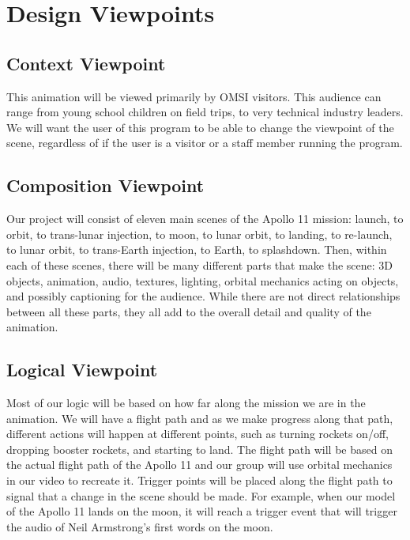 \documentclass[onecolumn, draftclsnofoot,10pt, compsoc]{IEEEtran}
\begin{document}
\section{Design Viewpoints}

    \subsection{Context Viewpoint}
    
    This animation will be viewed primarily by OMSI visitors. This audience can range from young school children on field trips, to very technical industry leaders. We will want the user of this program to be able to change the viewpoint of the scene, regardless of if the user is a visitor or a staff member running the program.  
    
    \subsection{Composition Viewpoint}
    
    Our project will consist of eleven main scenes of the Apollo 11 mission: launch, to orbit, to trans-lunar injection, to moon, to lunar orbit, to landing, to re-launch, to lunar orbit, to trans-Earth injection, to Earth, to splashdown. Then, within each of these scenes, there will be many different parts that make the scene: 3D objects, animation, audio, textures, lighting, orbital mechanics acting on objects, and possibly captioning for the audience. While there are not direct relationships between all these parts, they all add to the overall detail and quality of the animation. 
    
    \subsection{Logical Viewpoint}

    Most of our logic will be based on how far along the mission we are in the animation. We will have a flight path and as we make progress along that path, different actions will happen at different points, such as turning rockets on/off, dropping booster rockets, and starting to land. The flight path will be based on the actual flight path of the Apollo 11 and our group will use orbital mechanics in our video to recreate it. Trigger points will be placed along the flight path to signal that a change in the scene should be made. For example, when our model of the Apollo 11 lands on the moon, it will reach a trigger event that will trigger the audio of Neil Armstrong's first words on the moon. 
    
\end{document}

